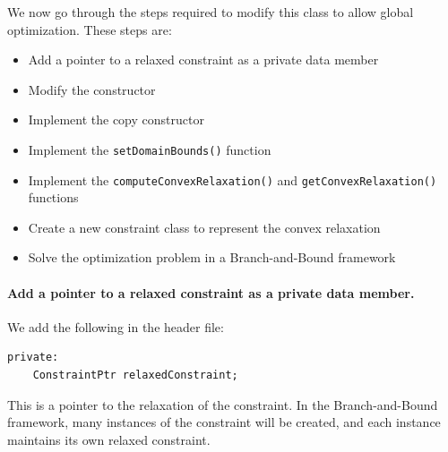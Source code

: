 We now go through the steps required to modify this class to allow global optimization. These steps are:
\begin{itemize}
\item Add a pointer to a relaxed constraint as a private data member
\item Modify the constructor
\item Implement the copy constructor
\item Implement the \texttt{setDomainBounds()} function
\item Implement the \texttt{computeConvexRelaxation()} and \texttt{getConvexRelaxation()} functions
\item Create a new constraint class to represent the convex relaxation
\item Solve the optimization problem in a Branch-and-Bound framework
\end{itemize}

\paragraph{Add a pointer to a relaxed constraint as a private data member.} We add the following in the header file:
\begin{lstlisting}
private:
	ConstraintPtr relaxedConstraint;
\end{lstlisting}
This is a pointer to the relaxation of the constraint.  In the Branch-and-Bound framework, many instances of the constraint will be created, and each instance maintains its own relaxed constraint.

